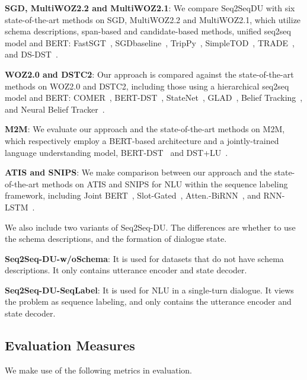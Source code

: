 \documentclass[11pt]{article}
\begin{document}
\noindent\textbf{SGD, MultiWOZ2.2 and MultiWOZ2.1}:
We compare Seq2SeqDU with six state-of-the-art methods on SGD, MultiWOZ2.2 and MultiWOZ2.1, which utilize schema descriptions, span-based and candidate-based methods, unified seq2seq model and BERT: FastSGT~\citep{noroozi2020fast}, SGDbaseline~\citep{rastogi2019towards}, TripPy~\citep{heck2020trippy}, SimpleTOD~\citep{hosseini2020simple}, TRADE~\citep{wu2019transferable}, and DS-DST~\citep{zhang2019find}.


\noindent\textbf{WOZ2.0 and DSTC2}: Our approach is compared against the state-of-the-art methods on WOZ2.0 and DSTC2, including those using a hierarchical seq2seq model and BERT: COMER~\cite{ren2019scalable}, BERT-DST~\citep{chao2019bert}, StateNet~\citep{ren2018towards}, GLAD~\citep{zhong2018global}, Belief Tracking~\citep{ramadan2018large}, and Neural Belief Tracker~\citep{mrkvsic2016neural}.

\noindent\textbf{M2M}:
We evaluate our approach and the state-of-the-art methods on M2M, which respectively employ a BERT-based architecture and a jointly-trained language understanding model, BERT-DST~\citep{chao2019bert} and DST+LU~\citep{rastogi2018multi}.

\noindent\textbf{ATIS and SNIPS}:
We make comparison between our approach and the state-of-the-art methods on ATIS and SNIPS for NLU within the sequence labeling framework, including Joint BERT~\citep{chen2019bert}, Slot-Gated~\citep{goo2018slot}, Atten.-BiRNN~\citep{liu2016attention}, and RNN-LSTM~\citep{hakkani2016multi}.

We also include two variants of Seq2Seq-DU. The differences are whether to use the schema descriptions, and the formation of dialogue state.









\noindent\textbf{Seq2Seq-DU-w/oSchema}:
It is used for datasets that do not have schema descriptions. It only contains utterance encoder and state decoder.

\noindent\textbf{Seq2Seq-DU-SeqLabel}:
It is used for NLU in a single-turn dialogue. It views the problem as sequence labeling, and only contains the utterance encoder and state decoder.

\subsection{Evaluation Measures}
We make use of the following metrics in evaluation.
\end{document}
